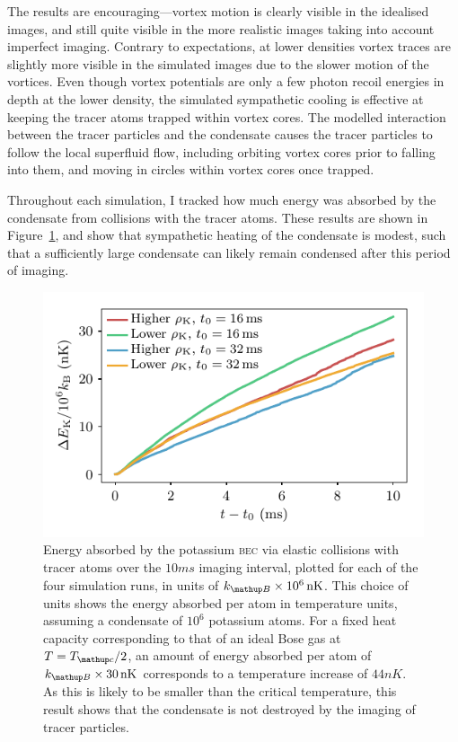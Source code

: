 The results are encouraging---vortex motion is clearly visible in the idealised images, and still quite visible in the more realistic images taking into account imperfect imaging. Contrary to expectations, at lower densities vortex traces are slightly more visible in the simulated images due to the slower motion of the vortices. Even though vortex potentials are only a few photon recoil energies in depth at the lower density, the simulated sympathetic cooling is effective at keeping the tracer atoms trapped within vortex cores. The modelled interaction between the tracer particles and the condensate causes the tracer particles to follow the local superfluid flow, including orbiting vortex cores prior to falling into them, and moving in circles within vortex cores once trapped.

Throughout each simulation, I tracked how much energy was absorbed by the condensate from collisions with the tracer atoms. These results are shown in Figure~\ref{fig:BEC_energy}, and show that sympathetic heating of the condensate is modest, such that a sufficiently large condensate can likely remain condensed after this period of imaging.

\begin{figure}
\begin{center}
\includegraphics{figures/velocimetry/energy.pdf}
\caption{Energy absorbed by the potassium \textsc{bec} via elastic collisions with tracer atoms over the $10\unit{ms}$ imaging interval, plotted for each of the four simulation runs, in units of $k_\up{B}\times10^6\unit{nK}$. This choice of units shows the energy absorbed per atom in temperature units, assuming a condensate of $10^6$ potassium atoms. For a fixed heat capacity corresponding to that of an ideal Bose gas at $T = T_\up{c}/2$, an amount of energy absorbed per atom of $k_\up{B}\times 30\unit{nK}$ corresponds to a temperature increase of $44\unit{nK}$. As this is likely to be smaller than the critical temperature, this result shows that the condensate is not destroyed by the imaging of tracer particles.}\label{fig:BEC_energy}
\end{center}
\end{figure}


